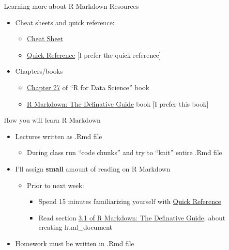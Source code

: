 \documentclass[
  8pt,
  ignorenonframetext,
  dvipsnames]{beamer}
\providecommand{\tightlist}{%
  \setlength{\itemsep}{0pt}\setlength{\parskip}{0pt}}
\renewcommand{\textbf}[1]{{\color{darkgray}\bfseries\fontfamily{Montserrat-TOsF}#1}}
\let\olditem\item
\renewcommand{\item}{%
  \olditem\vspace{4pt}
}
\begin{document}
\begin{frame}{Learning more about R Markdown}
\protect\hypertarget{learning-more-about-r-markdown}{}
Resources

\begin{itemize}
\tightlist
\item
  Cheat sheets and quick reference:

  \begin{itemize}
  \tightlist
  \item
    \href{https://www.rstudio.com/wp-content/uploads/2015/02/rmarkdown-cheatsheet.pdf}{Cheat
    Sheet}
  \item
    \href{https://www.rstudio.com/wp-content/uploads/2015/03/rmarkdown-reference.pdf}{Quick
    Reference} {[}I prefer the quick reference{]}
  \end{itemize}
\item
  Chapters/books

  \begin{itemize}
  \tightlist
  \item
    \href{http://r4ds.had.co.nz/r-markdown.html}{Chapter 27} of ``R for
    Data Science'' book
  \item
    \href{https://bookdown.org/yihui/rmarkdown/}{R Markdown: The
    Definative Guide} book {[}I prefer this book{]}
  \end{itemize}
\end{itemize}

How you will learn R Markdown

\begin{itemize}
\tightlist
\item
  Lectures written as .Rmd file

  \begin{itemize}
  \tightlist
  \item
    During class run ``code chunks'' and try to ``knit'' entire .Rmd
    file
  \end{itemize}
\item
  I'll assign \textbf{small} amount of reading on R Markdown

  \begin{itemize}
  \tightlist
  \item
    Prior to next week:

    \begin{itemize}
    \tightlist
    \item
      Spend 15 minutes familiarizing yourself with
      \href{https://www.rstudio.com/wp-content/uploads/2015/03/rmarkdown-reference.pdf}{Quick
      Reference}
    \item
      Read section
      \href{https://bookdown.org/yihui/rmarkdown/html-document.html}{3.1
      of R Markdown: The Definative Guide}, about creating
      html\_document
    \end{itemize}
  \end{itemize}
\item
  Homework must be written in .Rmd file


\end{itemize}
\end{frame}
\end{document}
